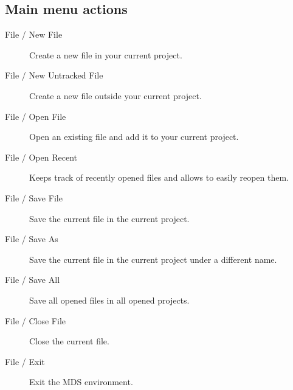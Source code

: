     \subsection{Main menu actions}
        \begin{description}
            \item[File / New File] Create a new file in your current project.
            \item[File / New Untracked File] Create a new file outside your current project.
            \item[File / Open File] Open an existing file and add it to your current project.
            \item[File / Open Recent] Keeps track of recently opened files and allows to easily reopen them.
            \item[File / Save File] Save the current file in the current project.
            \item[File / Save As] Save the current file in the current project under a different name.
            \item[File / Save All] Save all opened files in all opened projects.
            \item[File / Close File] Close the current file.
            \item[File / Exit] Exit the MDS environment.


\end{description}
